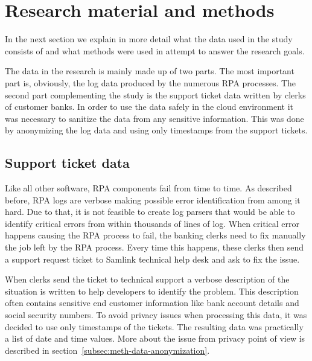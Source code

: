 

\section{Research material and methods}\label{sec:research-material-and-methods}

In the next section
we explain in more detail
what the data used in the study
consists of
and what methods were used
in attempt to answer the research goals.

The data in the research is mainly made up of two parts.
The most important part is, obviously,
the log data produced by the numerous RPA processes.
The second part complementing the study
is the support ticket data written by clerks of customer banks.
In order to use the data safely in the cloud environment
it was necessary to sanitize the data
from any sensitive information.
This was done by anonymizing the log data
and using only timestamps from the support tickets.


\subsection{Support ticket data}\label{subsec:meth-efecte-ticket-data}

Like all other software,
RPA components fail from time to time.
As described before,
RPA logs are verbose
making possible error identification from among it hard.
Due to that,
it is not feasible to create log parsers
that would be able to identify critical errors
from within thousands of lines of log.
When critical error happens
causing the RPA process to fail,
the banking clerks need to fix manually
the job left by the RPA process.
Every time this happens,
these clerks then send a support request ticket
to Samlink technical help desk
and ask to fix the issue.

When clerks send the ticket to technical support
a verbose description of the situation is written
to help developers to identify the problem.
This description often contains sensitive end customer information
like bank account details and social security numbers.
To avoid privacy issues when processing this data,
it was decided to use only timestamps of the tickets.
The resulting data was practically a list of date and time values.
More about the issue from privacy point of view
is described in section~\ref{subsec:meth-data-anonymization}.

